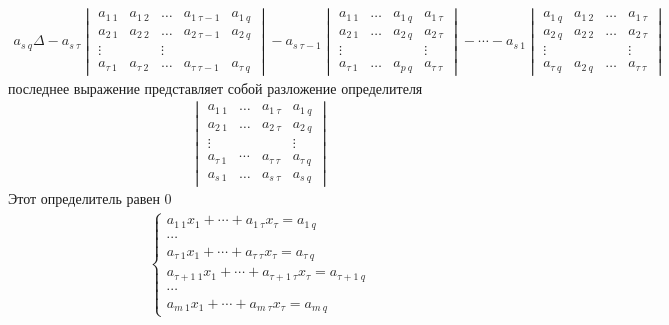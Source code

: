 		\begin{gather*}
		a_{s\  q} \Delta-a_{s\ \tau}
			\begin{vmatrix}
				{a_{1\ 1}} & {a_{1\ 2}} & {\ldots} & {a_{1\  \tau-1}} & {a_{1\  q}} \\
				{a_{2\ 1}} & {a_{2\ 2}} & {\ldots} & {a_{2\  \tau-1}} & {a_{2\  q}} \\
				{\vdots} & {} & {\vdots} & {} \\
				{a_{\tau\  1}} & {a_{\tau\  2}} & {\ldots} & {a_{\tau\  \tau-1}} & {a_{\tau\  q}}
			\end{vmatrix}
		-a_{s\  \tau-1}
			\begin{vmatrix}
				{a_{1\ 1}} & {\ldots} & {a_{1\  q}} & {a_{1\  \tau}} \\
				{a_{2\ 1}} & {\ldots} & {a_{2\  q}} & {a_{2\  \tau}} \\
				{\vdots} & {} & {} & {\vdots} \\
				{a_{\tau\  1}} & {\ldots} & {a_{p\  q}} & {a_{\tau\  \tau}}
			\end{vmatrix}
		-\cdots-a_{s\ 1}
			\begin{vmatrix}
				{a_{1\  q}} & {a_{1\ 2}} & {\ldots} & {a_{1\  \tau}} \\
				{a_{2\  q}} & {a_{2\ 2}} & {\ldots} & {a_{2\  \tau}} \\
				{\vdots} & {} & {} & {\vdots} \\
				{a_{\tau\  q}} & {a_{2\  q}} & {\ldots} & {a_{\tau\  \tau}}
			\end{vmatrix}		
		\end{gather*}
		последнее выражение представляет собой разложение определителя\\
		\begin{gather*}
			\begin{vmatrix}
				{a_{1\ 1}} & {\dots} & {a_{1\  \tau}} & {a_{1\  q}}\\
				{a_{2\ 1}} & {\dots} & {a_{2\  \tau}} & {a_{2\  q}}\\
				{\vdots} & {} & {} & {\vdots}\\
				{a_{\tau\ 1}} & {\cdots} & {a_{\tau\  \tau}} & {a_{\tau\  q}}\\
				{a_{s\  1}} & {\dots} & {a_{s\  \tau}} & {a_{s\  q}}
			\end{vmatrix}
		\end{gather*}
		Этот определитель равен 0
		\begin{gather*}
			\begin{cases} 
				a_{1\ 1} x_{1}+\cdots+a_{1\ \tau} x_{\tau} = a_{1\ q}\\
				\cdots\\
				a_{\tau\ 1} x_{1}+\cdots+a_{\tau\ \tau} x_{\tau} = a_{\tau\ q}\\
				a_{\tau+1\ 1} x_{1}+\cdots+a_{\tau+1\ \tau} x_{\tau} = a_{\tau+1\ q}\\
				\cdots\\
				a_{m\ 1} x_{1}+\cdots+a_{m\ \tau} x_{\tau} = a_{m\ q} 
			\end{cases}
		\end{gather*}
